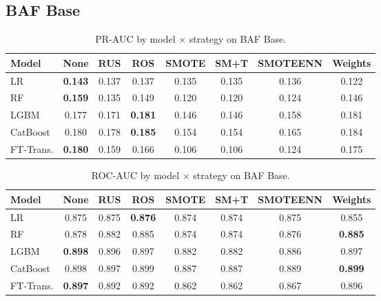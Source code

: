 
\subsection{BAF Base}

\begin{table}[ht!]
\centering
\caption{PR-AUC by model $\times$ strategy on BAF Base.}
\label{tab:factorial_baf_prauc}
\begin{tabular}{l c c c c c c c}
\toprule
Model & None & RUS & ROS & SMOTE & SM+T & SMOTEENN & Weights \\
\midrule
LR         & \textbf{0.143} & 0.137 & 0.137 & 0.135 & 0.135 & 0.136 & 0.122 \\
RF         & \textbf{0.159} & 0.135 & 0.149 & 0.120 & 0.120 & 0.124 & 0.146 \\
LGBM       & 0.177 & 0.171 & \textbf{0.181} & 0.146 & 0.146 & 0.158 & 0.181 \\
CatBoost   & 0.180 & 0.178 & \textbf{0.185} & 0.154 & 0.154 & 0.165 & 0.184 \\
FT-Trans.  & \textbf{0.180} & 0.159 & 0.166 & 0.106 & 0.106 & 0.124 & 0.175 \\
\bottomrule
\end{tabular}
\end{table}

\begin{table}[ht!]
\centering
\caption{ROC-AUC by model $\times$ strategy on BAF Base.}
\label{tab:factorial_baf_rocauc}
\begin{tabular}{l c c c c c c c}
\toprule
Model & None & RUS & ROS & SMOTE & SM+T & SMOTEENN & Weights \\
\midrule
LR         & 0.875 & 0.875 & \textbf{0.876} & 0.874 & 0.874 & 0.875 & 0.855 \\
RF         & 0.878 & 0.882 & 0.885 & 0.874 & 0.874 & 0.876 & \textbf{0.885} \\
LGBM       & \textbf{0.898} & 0.896 & 0.897 & 0.882 & 0.882 & 0.886 & 0.897 \\
CatBoost   & 0.898 & 0.897 & 0.899 & 0.887 & 0.887 & 0.889 & \textbf{0.899} \\
FT-Trans.  & \textbf{0.897} & 0.892 & 0.892 & 0.862 & 0.862 & 0.867 & 0.896 \\
\bottomrule
\end{tabular}
\end{table}


